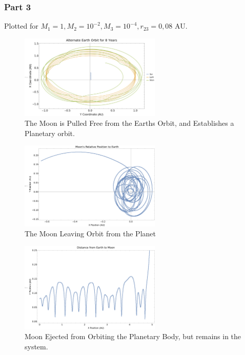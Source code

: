 \documentclass{article}
\begin{document}
\subsubsection{Part 3}

Plotted for $M_1 = 1, M_2 = 10^{-2}, M_3 = 10^{-4}, r_{23} = 0,08$ AU. 

\begin{figure}[!htb]
	\begin{center}
		\includegraphics[width=0.6\textwidth]{images/p1-3a.pdf}
	\end{center}
	\caption{The Moon is Pulled Free from the Earths Orbit, and Establishes a Planetary orbit.}
\label{fig:qual}
\end{figure}
\FloatBarrier

\begin{figure}[!htb]
	\begin{center}
		\includegraphics[width=0.6\textwidth]{images/p1-3b.pdf}
	\end{center}
	\caption{The Moon Leaving Orbit from the Planet}
\label{fig:qual}
\end{figure}
\FloatBarrier

\begin{figure}[!htb]
	\begin{center}
		\includegraphics[width=0.6\textwidth]{images/p1-3c.pdf}
	\end{center}
	\caption{Moon Ejected from Orbiting the Planetary Body, but remains in the system.}
\label{fig:qual}
\end{figure}
\FloatBarrier
\end{document}
